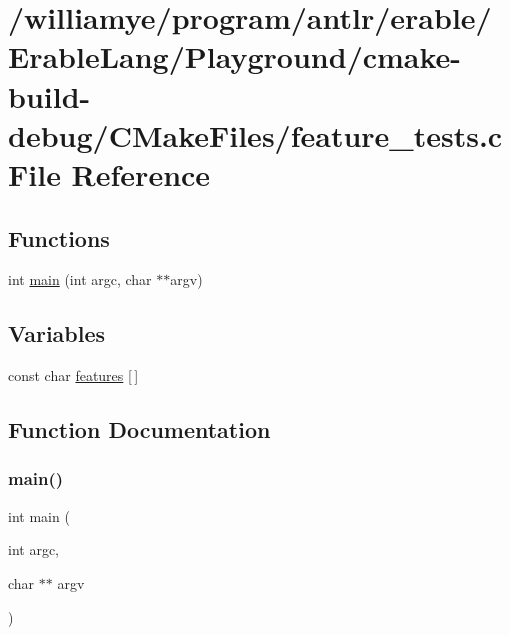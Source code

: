 \hypertarget{_playground_2cmake-build-debug_2_c_make_files_2feature__tests_8c}{}\section{/williamye/program/antlr/erable/\+Erable\+Lang/\+Playground/cmake-\/build-\/debug/\+C\+Make\+Files/feature\+\_\+tests.c File Reference}
\label{_playground_2cmake-build-debug_2_c_make_files_2feature__tests_8c}
\subsection*{Functions}
\begin{DoxyCompactItemize}
\item 
int \mbox{\hyperlink{_playground_2cmake-build-debug_2_c_make_files_2feature__tests_8c_a3c04138a5bfe5d72780bb7e82a18e627}{main}} (int argc, char $\ast$$\ast$argv)
\end{DoxyCompactItemize}
\subsection*{Variables}
\begin{DoxyCompactItemize}
\item 
const char \mbox{\hyperlink{_playground_2cmake-build-debug_2_c_make_files_2feature__tests_8c_a1582568e32f689337602a16bf8a5bff0}{features}} \mbox{[}$\,$\mbox{]}
\end{DoxyCompactItemize}


\subsection{Function Documentation}
\mbox{\label{_playground_2cmake-build-debug_2_c_make_files_2feature__tests_8c_a3c04138a5bfe5d72780bb7e82a18e627}} 
\subsubsection{\texorpdfstring{main()}{main()}}
{\footnotesize\ttfamily int main (\begin{DoxyParamCaption}\item[{int}]{argc,  }\item[{char $\ast$$\ast$}]{argv }\end{DoxyParamCaption})}



